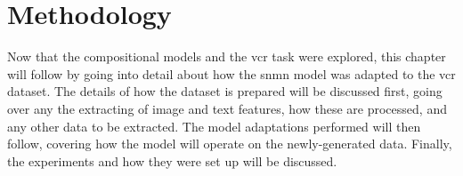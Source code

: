 \chapter{Methodology}
\label{chp:methodology}

Now that the compositional models and the \gls{vcr} task were explored, this chapter will follow by going into detail about how the \gls{snmn} model was adapted to the \gls{vcr} dataset.
The details of how the dataset is prepared will be discussed first, going over any the extracting of image and text features, how these are processed, and any other data to be extracted.
The model adaptations performed will then follow, covering how the model will operate on the newly-generated data.
Finally, the experiments and how they were set up will be discussed.






